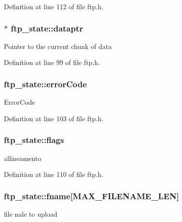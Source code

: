 Definition at line 112 of file ftp.h.

\hypertarget{group__ftp_gaafd205f52235c549ebeda2c92d60c17d}{
\subsubsection[{dataptr}]{$\ast$ {\bf ftp\_\-state::dataptr}}}
\label{group__ftp_gaafd205f52235c549ebeda2c92d60c17d}
Pointer to the current chunk of data 

Definition at line 99 of file ftp.h.

\hypertarget{group__ftp_gab56dd9f99723858913198075ba43c2aa}{
\subsubsection[{errorCode}]{ {\bf ftp\_\-state::errorCode}}}
\label{group__ftp_gab56dd9f99723858913198075ba43c2aa}
ErrorCode 

Definition at line 103 of file ftp.h.

\hypertarget{group__ftp_ga86be9ef59e2087fdbfdb4886f5289e5c}{
\subsubsection[{flags}]{ {\bf ftp\_\-state::flags}}}
\label{group__ftp_ga86be9ef59e2087fdbfdb4886f5289e5c}
allineamento 

Definition at line 110 of file ftp.h.

\hypertarget{group__ftp_gadc6947ba105e712aad11b7c35604d89c}{
\subsubsection[{fname}]{ {\bf ftp\_\-state::fname}\mbox{[}MAX\_\-FILENAME\_\-LEN\mbox{]}}}
\label{group__ftp_gadc6947ba105e712aad11b7c35604d89c}
file nale to upload 

